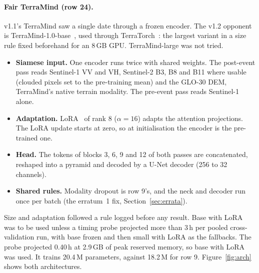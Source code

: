 \documentclass[10pt,twocolumn,a4paper]{article}
\begin{document}
\paragraph{Fair TerraMind (row 24).} v1.1's TerraMind saw a single date through a frozen encoder. The v1.2 opponent is
TerraMind-1.0-base~\citep{jakubik2025terramind}, used through TerraTorch~\citep{gomes2025terratorch}: the largest
variant in a size rule fixed beforehand for an 8\,GB GPU. TerraMind-large was not tried.
\begin{itemize}
  \item \textbf{Siamese input.} One encoder runs twice with shared weights. The post-event pass reads Sentinel-1 VV
    and VH, Sentinel-2 B3, B8 and B11 where usable (clouded pixels set to the pre-training mean) and the GLO-30 DEM,
    TerraMind's native terrain modality. The pre-event pass reads Sentinel-1 alone.
  \item \textbf{Adaptation.} LoRA~\citep{hu2021lora} of rank 8 ($\alpha=16$) adapts the attention projections. The
    LoRA update starts at zero, so at initialisation the encoder is the pre-trained one.
  \item \textbf{Head.} The tokens of blocks 3, 6, 9 and 12 of both passes are concatenated, reshaped into a pyramid
    and decoded by a U-Net decoder (256 to 32 channels).
  \item \textbf{Shared rules.} Modality dropout is row 9's, and the neck and decoder run once per batch (the erratum~1
    fix, Section~\ref{sec:errata}).
\end{itemize}
Size and adaptation followed a rule logged before any result. Base with LoRA was to be used unless a timing probe
projected more than 3\,h per pooled cross-validation run, with base frozen and then small with LoRA as the
fallbacks. The probe projected 0.40\,h at 2.9\,GB of peak reserved memory, so base with LoRA was used. It trains
20.4\,M parameters, against 18.2\,M for row 9. Figure~\ref{fig:arch} shows both architectures.
\end{document}
